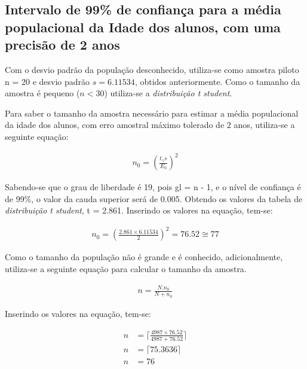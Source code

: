 \subsection{Intervalo de 99\% de confiança para a média populacional da Idade dos alunos, com uma precisão de 2 anos}

	Com o desvio padrão da população desconhecido, utiliza-se como amostra
	piloto n = 20 e desvio padrão $s = \num{6,11534}$, obtidos anteriormente. Como o
	tamanho da amostra é pequeno ($n < 30$) utiliza-se a
	\textit{distribuição t student}.

	Para saber o tamanho da amostra necessário para estimar a média
	populacional da idade dos alunos, com erro amostral máximo tolerado de 2
	anos, utiliza-se a seguinte equação:

	\begin{align}
		\label{eq:dois-b-expr1}
		 n_0 = \left (\frac{t_\gamma s}{E_0} \right)^2
	\end{align}

	Sabendo-se que o grau de liberdade é 19, pois gl = n - 1, e o nível de
	confiança é de 99\%, o valor da cauda superior será de \num{0,005}. Obtendo os
	valores da tabela de \textit{distribuição t student}, t = \num{2,861}.
	Inserindo os valores na equação, tem-se:

	\begin{align*}
		n_0 = \left (\frac{\num{2,861} \times \num{6,11534}}{2} \right)^2 = \num{76,52} \cong 77
	\end{align*}

	Como o tamanho da população não é grande e é conhecido, adicionalmente,
	utiliza-se a seguinte equação para calcular o tamanho da amostra.

	\begin{align}
		\label{eq:dois-b-expr2}
		n = \frac{N . n_0}{N + n_0}
	\end{align}

	Inserindo os valores na equação, tem-se:

	\begin{align*}
		n &= \Big\lceil \frac{4987 \times \num{76,52}}{4987 + \num{76,52}} \Big\rceil \\
		n &= \lceil \num{75,3636} \rceil \\
		n &= 76
	\end{align*}


